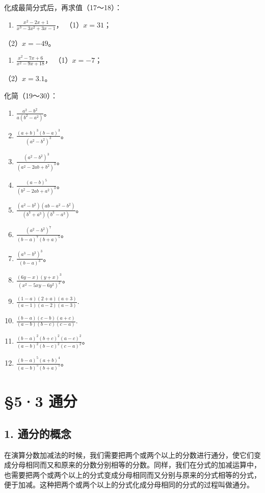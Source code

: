 化成最简分式后，再求值（17～18）：

\begin{enumerate}[start=17]
\item
  \(\frac{x^2 - 2x + 1}{x^3 - 3x^2 + 3x - 1}\)， （1）\(x = 31\)；
\end{enumerate}
（2）\(x = -49\)。

\begin{enumerate}[start=18]
\item
  \(\frac{x^2 - 7x + 6}{x^2 - 9x + 18}\)， （1）\(x = -7\)；
\end{enumerate}
（2）\(x = 3.1\)。

化简（19～30）：

\begin{enumerate}[start=19]
\item
  \(\frac{a^2 - b^2}{a(b^2 - a^2)}\)。
\item
  \(\frac{(a + b)^3(b - a)^3}{(a^2 - b^2)^3}\)。
\item
  \(\frac{(a^2 - b^2)^3}{(a^2 - 2ab + b^2)^3}\)。
\item
  \(\frac{(a - b)^5}{(b^2 - 2ab + a^2)^3}\)。
\item
  \(\frac{(a^2 - b^2)(ab - a^2 - b^2)}{(b^3 + a^3)(b^3 - a^3)}\)。
\item
  \(\frac{(a^2 - b^2)^7}{(b - a)^7(b + a)^5}\)。
\item
  \(\frac{(a^3 - b^3)^3}{(b - a)^3}\)。
\item
  \(\frac{(6y - x)(y + x)^3}{(x^2 - 5xy - 6y^2)^2}\)。
\item
  \(\frac{(1 - a)(2 + a)(a + 3)}{(a - 1)(a - 2)(a - 3)}.\)
\item
  \(\frac{(b - a)(c - b)(a + c)}{(a - b)(b - c)(c - a)}.\)
\item
  \(\frac{(b - a)^2(b + c)^2(a - c)^2}{(a - b)^2(b - c)^2(c - a)^2}\)。
\item
  \(\frac{(b - a)^5(a + b)^4}{(a - b)^5(b + a)^5}\)。
\end{enumerate}

\section{§5·3 通分}

\subsection{1. 通分的概念}

在演算分数加减法的时候，我们需要把两个或两个以上的分数进行通分，使它们变成分母相同而又和原来的分数分别相等的分数。同样，我们在分式的加减运算中，也需要把两个或两个以上的分式变成分母相同而又分别与原来的分式相等的分式，便于加减。这种把两个或两个以上的分式化成分母相同的分式的过程叫做通分。

